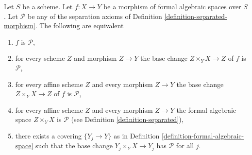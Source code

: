\begin{lemma}
\label{lemma-separated-local}
Let $S$ be a scheme. Let $f : X \to Y$ be a morphism of formal algebraic spaces
over $S$. Let $\mathcal{P}$ be any of the separation axioms of
Definition \ref{definition-separated-morphism}.
The following are equivalent
\begin{enumerate}
\item $f$ is $\mathcal{P}$,
\item for every scheme $Z$ and morphism $Z \to Y$ the
base change $Z \times_Y X \to Z$ of $f$ is $\mathcal{P}$,
\item for every affine scheme $Z$ and every morphism $Z \to Y$ the
base change $Z \times_Y X \to Z$ of $f$ is $\mathcal{P}$,
\item for every affine scheme $Z$ and every morphism $Z \to Y$ the
formal algebraic space $Z \times_Y X$ is $\mathcal{P}$ (see
Definition \ref{definition-separated}),
\item there exists a covering $\{Y_j \to Y\}$ as in
Definition \ref{definition-formal-algebraic-space}
such that the base change $Y_j \times_Y X \to Y_j$ has
$\mathcal{P}$ for all $j$.
\end{enumerate}
\end{lemma}

